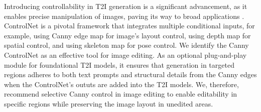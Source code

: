 \documentclass{article}
\begin{document}
Introducing controllability in T2I generation is a significant advancement, as it enables precise manipulation of images, paving its way to broad applications \citep{tan2024ominicontrol,zhang2023adding,li2024controlnet++,li2024unimo,zhao2023uni}. ControlNet \citep{zhang2023adding} is a pivotal framework that integrates multiple conditional inputs, for example, using Canny edge map for image's layout control, using depth map for spatial control, and using skeleton map for pose control. We identify the Canny ControlNet as an effective tool for image editing. As an optional plug-and-play module for foundational T2I models, it ensures that generation in targeted regions adheres to both text prompts and structural details from the Canny edges  \citep{canny1986computational} when the ControlNet's oututs are added into the T2I models. We, therefore, recommend selective Canny control in image editing to enable editability in specific regions while preserving the image layout in unedited areas.










 
\end{document}
